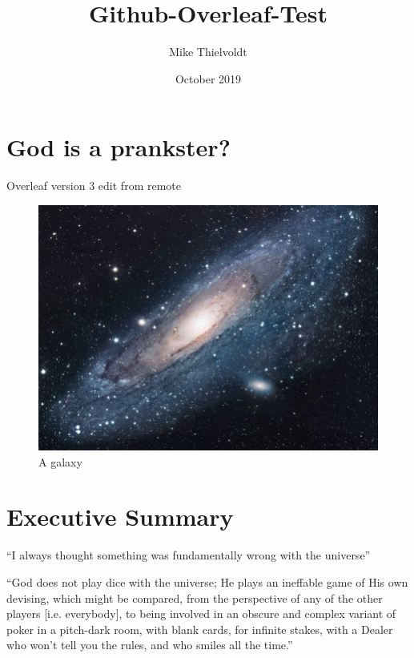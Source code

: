 \documentclass{article}
\title{Github-Overleaf-Test}
\author{Mike Thielvoldt}
\date{October 2019}
\begin{document}
\maketitle

\section{God is a prankster?}

Overleaf version 3 edit from remote

\begin{figure}[h!]
\centering
\includegraphics[scale=1.7]{universe}
\caption{A galaxy}
\label{fig:universe}
\end{figure}


\section{Executive Summary}
``I always thought something was fundamentally wrong with the universe'' \citep{adams1995hitchhiker}
\newline

``God does not play dice with the universe; He plays an ineffable game of His own devising, which might be compared, from the perspective of any of the other players [i.e. everybody], to being involved in an obscure and complex variant of poker in a pitch-dark room, with blank cards, for infinite stakes, with a Dealer who won't tell you the rules, and who smiles all the time.'' \citep{pratchett1990goodomens}



\end{document}
